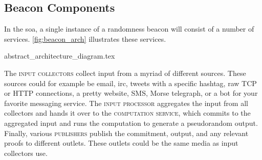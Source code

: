 \subsection{Beacon Components}%
\label{sub:components_of_a_beacon}

In the \gls{soa}, a single instance of a randomness beacon will consist of a number of services. \cref{fig:beacon_arch} illustrates these services.

{abstract_architecture_diagram.tex}

The \textsc{input collectors} collect input from a myriad of different sources. These sources could for example be email, irc, tweets with a specific hashtag, raw TCP or HTTP connections, a pretty website, SMS, Morse telegraph, or a bot for your favorite messaging service.
The \textsc{input processor} aggregates the input from all collectors and hands it over to the \textsc{computation service}, which commits to the aggregated input and runs the computation to generate a pseudorandom output.
Finally, various \textsc{publishers} publish the commitment, output, and any relevant proofs to different outlets. These outlets could be the same media as input collectors use.
